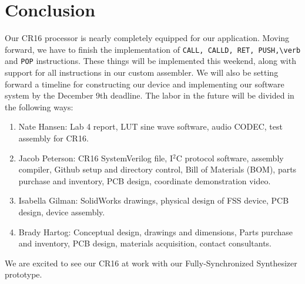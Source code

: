 \documentclass[conference]{IEEEtran}
\begin{document}
\section{Conclusion}
Our CR16 processor is nearly completely equipped for our application. Moving forward, we have to finish the implementation of \verb|CALL, CALLD, RET, PUSH,\verb| and \verb|POP| instructions. These things will be implemented this weekend, along with support for all instructions in our custom assembler. We will also be setting forward a timeline for constructing our device and implementing our software system by the December 9th deadline. The labor in the future will be divided in the following ways:
\begin{enumerate}
    \item Nate Hansen: Lab 4 report, LUT sine wave software, audio CODEC, test assembly for CR16.
    \item Jacob Peterson: CR16 SystemVerilog file, I$^2$C protocol software, assembly compiler, Github setup and directory control, Bill of Materials (BOM), parts purchase and inventory, PCB design, coordinate demonstration video.
    \item Isabella Gilman: SolidWorks drawings, physical design of FSS device, PCB design, device assembly.
    \item Brady Hartog: Conceptual design, drawings and dimensions, Parts purchase and inventory, PCB design, materials acquisition, contact consultants.
\end{enumerate}

We are excited to see our CR16 at work with our Fully-Synchronized Synthesizer prototype.

\clearpage
{}

\end{document}
